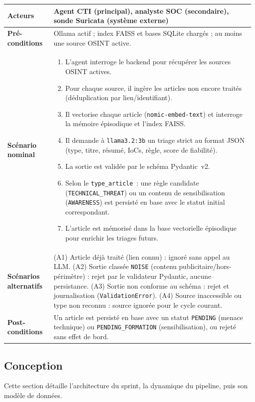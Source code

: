 \begin{xltabular}{\textwidth}{|l|>{\raggedright\arraybackslash}X|}
\textbf{Acteurs} & Agent CTI (principal), analyste SOC (secondaire), sonde Suricata (système externe) \\ \hline
\textbf{Pré-conditions} & Ollama actif ; index FAISS et bases SQLite chargés ; au moins une source OSINT active. \\ \hline
\textbf{Scénario nominal} &
\begin{enumerate}[nosep,leftmargin=*]
\item L'agent interroge le backend pour récupérer les sources OSINT actives.
\item Pour chaque source, il ingère les articles non encore traités (déduplication par lien/identifiant).
\item Il vectorise chaque article (\texttt{nomic-embed-text}) et interroge la mémoire épisodique et l'index FAISS.
\item Il demande à \texttt{llama3.2:3b} un triage strict au format JSON (type, titre, résumé, IoCs, règle, score de fiabilité).
\item La sortie est validée par le schéma Pydantic~v2.
\item Selon le \texttt{type\_article}~: une règle candidate (\texttt{TECHNICAL\_THREAT}) ou un contenu de sensibilisation (\texttt{AWARENESS}) est persisté en base avec le statut initial correspondant.
\item L'article est mémorisé dans la base vectorielle épisodique pour enrichir les triages futurs.
\end{enumerate} \\ \hline
\textbf{Scénarios alternatifs} & (A1) Article déjà traité (lien connu) : ignoré sans appel au LLM. (A2) Sortie classée \texttt{NOISE} (contenu publicitaire/hors-périmètre) : rejet par le validateur Pydantic, aucune persistance. (A3) Sortie non conforme au schéma : rejet et journalisation (\texttt{ValidationError}). (A4) Source inaccessible ou type non reconnu : source ignorée pour le cycle courant. \\ \hline
\textbf{Post-conditions} & Un article est persisté en base avec un statut \texttt{PENDING} (menace technique) ou \texttt{PENDING\_FORMATION} (sensibilisation), ou rejeté sans effet de bord. \\ \hline

\end{xltabular}
\newpage
\subsection{Conception}
Cette section détaille l'architecture du sprint, la dynamique du pipeline, puis son modèle de données.

